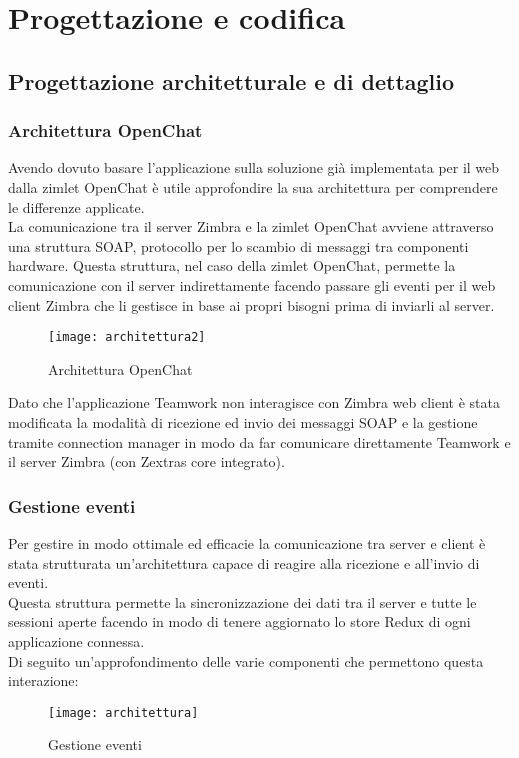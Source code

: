 \chapter{Progettazione e codifica }\label{chap:design}

\section {Progettazione architetturale e di dettaglio}
\subsection{Architettura OpenChat}
Avendo dovuto basare l'applicazione sulla soluzione già implementata per il web dalla zimlet OpenChat è utile approfondire la sua architettura per comprendere le differenze applicate. \\
La comunicazione tra il server Zimbra e la zimlet OpenChat avviene attraverso una struttura SOAP, protocollo per lo scambio di messaggi tra componenti hardware.
Questa struttura, nel caso della zimlet OpenChat, permette la comunicazione con il server indirettamente facendo passare gli eventi per il web client Zimbra che li gestisce in base ai propri bisogni prima di inviarli al server. \\
\begin{figure}[H] 
	\centering
	\texttt{[image: architettura2]}
	\caption{Architettura OpenChat}
\end{figure}
Dato che l'applicazione Teamwork non interagisce con Zimbra web client è stata modificata la modalità di ricezione ed invio dei messaggi SOAP e la gestione tramite connection manager in modo da far comunicare direttamente Teamwork e il server Zimbra (con Zextras core integrato).

\subsection{Gestione eventi}
Per gestire in modo ottimale ed efficacie la comunicazione tra server e client è stata strutturata un'architettura capace di reagire alla ricezione e all'invio di eventi. \\
Questa struttura permette la sincronizzazione dei dati tra il server e tutte le sessioni aperte facendo in modo di tenere aggiornato lo store Redux di ogni applicazione connessa.\\
Di seguito un'approfondimento delle varie componenti che permettono questa interazione:
\begin{figure}[H] 
	\centering
	\texttt{[image: architettura]}
	\caption{Gestione eventi}
\end{figure}
